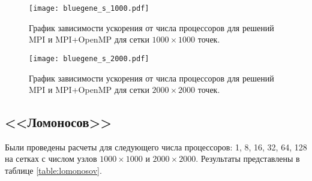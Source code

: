 \begin{table}[H]
  \centering
  
  \caption{Таблица с результатами расчетов на ПВС <<IBM Blue Gene/P>> с использованием \texttt{OpenMP}.}
  \label{table:bluegene_omp}
\end{table}

\begin{figure}[H]
    \centering
    \texttt{[image: bluegene\_s\_1000.pdf]}
    \caption{График зависимости ускорения от числа процессоров для решений MPI и MPI+OpenMP для сетки $1000 \times 1000$ точек.}
    \label{fig:bluegene_s_1000}
\end{figure}

\begin{figure}[H]
    \centering
    \texttt{[image: bluegene\_s\_2000.pdf]}
    \caption{График зависимости ускорения от числа процессоров для решений MPI и MPI+OpenMP для сетки $2000 \times 2000$ точек.}
    \label{fig:bluegene_s_2000}
\end{figure}

\subsection{<<Ломоносов>>}

Были проведены расчеты для следующего числа процессоров: 1, 8, 16, 32, 64, 128 на сетках с числом узлов $1000 \times 1000$ и $2000 \times 2000$. Результаты представлены в таблице \ref{table:lomonosov}.

